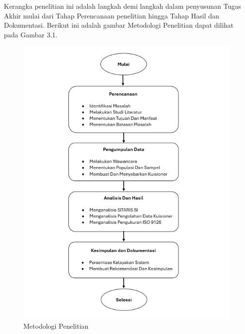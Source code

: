%
%
%
%


\chapter{\babTiga}
Kerangka penelitian ini adalah langkah demi langkah dalam penyusunan Tugas Akhir mulai dari Tahap Perencanaan penelitian hingga Tahap Hasil dan Dokumentasi. Berikut ini adalah gambar Metodologi Penelitian dapat dilihat pada Gambar 3.1.
\begin{figure}
	\centering
	\includegraphics[width=0.82\linewidth]{konten//gambar/metodologi-penelitian.png}
	\caption{Metodologi Penelitian}
	\label{fig:enter-label}
\end{figure}

